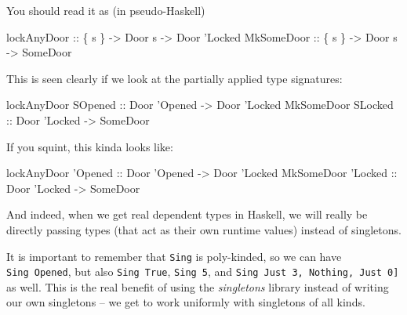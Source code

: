 \documentclass[]{article}
\newenvironment{Shaded}{}{}
\newcommand{\DataTypeTok}[1]{\textcolor[rgb]{0.56,0.13,0.00}{#1}}
\newcommand{\NormalTok}[1]{#1}
\newcommand{\OtherTok}[1]{\textcolor[rgb]{0.00,0.44,0.13}{#1}}
\begin{document}
You should read it as (in pseudo-Haskell)

\begin{Shaded}
\begin{Highlighting}[]
\OtherTok{lockAnyDoor ::}\NormalTok{ \{ s \} }\OtherTok{->} \DataTypeTok{Door}\NormalTok{ s }\OtherTok{->} \DataTypeTok{Door}\NormalTok{ '}\DataTypeTok{Locked}
\DataTypeTok{MkSomeDoor}\OtherTok{  ::}\NormalTok{ \{ s \} }\OtherTok{->} \DataTypeTok{Door}\NormalTok{ s }\OtherTok{->} \DataTypeTok{SomeDoor}
\end{Highlighting}
\end{Shaded}

This is seen clearly if we look at the partially applied type signatures:

\begin{Shaded}
\begin{Highlighting}[]
\NormalTok{lockAnyDoor }\DataTypeTok{SOpened}\OtherTok{ ::} \DataTypeTok{Door}\NormalTok{ '}\DataTypeTok{Opened} \OtherTok{->} \DataTypeTok{Door}\NormalTok{ '}\DataTypeTok{Locked}
\DataTypeTok{MkSomeDoor}  \DataTypeTok{SLocked}\OtherTok{ ::} \DataTypeTok{Door}\NormalTok{ '}\DataTypeTok{Locked} \OtherTok{->} \DataTypeTok{SomeDoor}
\end{Highlighting}
\end{Shaded}

If you squint, this kinda looks like:

\begin{Shaded}
\begin{Highlighting}[]
\NormalTok{lockAnyDoor '}\DataTypeTok{Opened}\OtherTok{ ::} \DataTypeTok{Door}\NormalTok{ '}\DataTypeTok{Opened} \OtherTok{->} \DataTypeTok{Door}\NormalTok{ '}\DataTypeTok{Locked}
\DataTypeTok{MkSomeDoor}\NormalTok{  '}\DataTypeTok{Locked}\OtherTok{ ::} \DataTypeTok{Door}\NormalTok{ '}\DataTypeTok{Locked} \OtherTok{->} \DataTypeTok{SomeDoor}
\end{Highlighting}
\end{Shaded}

And indeed, when we get real dependent types in Haskell, we will really be
directly passing types (that act as their own runtime values) instead of
singletons.

It is important to remember that \texttt{Sing} is poly-kinded, so we can have
\texttt{Sing\ \textquotesingle{}Opened}, but also
\texttt{Sing\ \textquotesingle{}True}, \texttt{Sing\ 5}, and
\texttt{Sing\ \textquotesingle{}{[}\textquotesingle{}Just\ 3,\ \textquotesingle{}Nothing,\ \textquotesingle{}Just\ 0{]}}
as well. This is the real benefit of using the \emph{singletons} library instead
of writing our own singletons -- we get to work uniformly with singletons of all
kinds.
\end{document}
